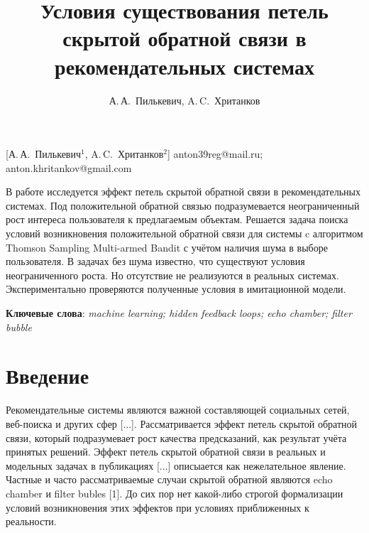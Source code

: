 \documentclass[12pt, twoside]{article}
\begin{document}
\title
    [] %
    {Условия существования петель скрытой обратной связи в рекомендательных системах}
\author
    [А.\,А.~Пилькевич] %
    {А.\,А.~Пилькевич, A.\,C.~Хританков} %
    [А.\,А.~Пилькевич$^1$, A.\,C.~Хританков$^2$] %
\email
   {anton39reg@mail.ru; anton.khritankov@gmail.com}
\abstract
  {В работе исследуется эффект  петель скрытой обратной связи в рекомендательных системах.
  Под положительной обратной связью подразумевается неограниченный рост интереса пользователя к предлагаемым объектам. 
  Решается задача поиска условий возникновения положительной обратной связи для системы c алгоритмом Thomson Sampling Multi-armed Bandit с учётом наличия шума в выборе пользователя.
  В задачах без шума известно, что существуют условия неограниченного роста. 
  Но отсутствие не реализуются в реальных системах.
  Экспериментально проверяются полученные условия в имитационной модели.

\bigskip
\noindent
\textbf{Ключевые слова}: \emph {machine learning; hidden feedback loops; echo chamber; filter bubble}
}
\doi{}
\receivedRus{}
\receivedEng{}

\maketitle
\linenumbers
\section{Введение}
Рекомендательные системы являются важной составляющей социальных сетей, веб-поиска и других сфер [...]. 
Рассматривается эффект петель скрытой обратной связи, который подразумевает рост качества предсказаний, как результат учёта принятых решений. 
Эффект петель скрытой обратной связи в реальных и модельных задачах в  публикациях [...] описыается как нежелательное явление. 
Частные и часто рассматриваемые случаи скрытой обратной являются echo chamber и filter bubles [1].
До сих пор нет какой-либо строгой формализации условий возникновения этих эффектов при условиях приближенных к реальности. 
\end{document}
